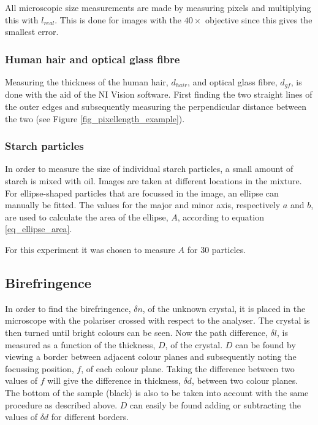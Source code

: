All microscopic size measurements are made by measuring pixels and multiplying this with $l_{real}$. This is done for images with the $40\times$ objective since this gives the smallest error.

\subsubsection{Human hair and optical glass fibre}

Measuring the thickness of the human hair, $d_{hair}$, and optical glass fibre, $d_{gf}$, is done with the aid of the NI Vision software. First finding the two straight lines of the outer edges and subsequently measuring the perpendicular distance between the two (see Figure \ref{fig_pixellength_example}). 

\subsubsection{Starch particles}

In order to measure the size of individual starch particles, a small amount of starch is mixed with oil. Images are taken at different locations in the mixture. For ellipse-shaped particles that are focussed in the image, an ellipse can manually be fitted. The values for the major and minor axis, respectively $a$ and $b$, are used to calculate the area of the ellipse, $A$, according to equation \ref{eq_ellipse_area}.

For this experiment it was chosen to measure $A$ for 30 particles.


\subsection{Birefringence}

In order to find the birefringence, $\delta n$, of the unknown crystal, it is placed in the microscope with the polariser crossed with respect to the analyser. The crystal is then turned until bright colours can be seen. Now the path difference, $\delta l$, is measured as a function of the thickness, $D$, of the crystal. $D$ can be found by viewing a border between adjacent colour planes and subsequently noting the focussing position, $f$, of each colour plane. Taking the difference between two values of $f$ will give the difference in thickness, $\delta d$, between two colour planes. The bottom of the sample (black) is also to be taken into account with the same procedure as described above. $D$ can easily be found adding or subtracting the values of $\delta d$ for different borders. 

